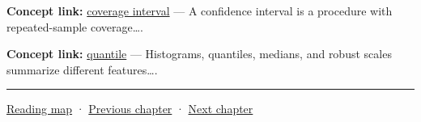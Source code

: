 \textbf{Concept link:} \hyperref[02-foundations-ii-ch030-inference-and-error-metrics-need-explicit-assumptions]{coverage interval} --- A confidence interval is a procedure with repeated-sample coverage\ldots.

\textbf{Concept link:} \hyperref[02-foundations-ii-ch030-inference-and-error-metrics-need-explicit-assumptions]{quantile} --- Histograms, quantiles, medians, and robust scales summarize different features\ldots.

\begin{center}\rule{0.5\linewidth}{0.5pt}\end{center}

\hyperref[volume-reading-map]{Reading map} · \hyperref[02-foundations-ii-ch029-discretization-convergence-and-experimental-design]{Previous chapter} · \hyperref[02-foundations-ii-ch031-implement-probability-with-numerical-contracts]{Next chapter}
